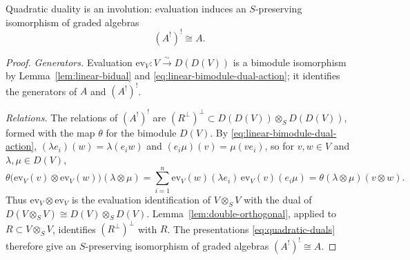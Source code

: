 \begin{theorem}\label{thm:quadratic-involution}
Quadratic duality is an involution: evaluation induces an $S$-preserving isomorphism of graded algebras
\[
(A^!)^!\cong A.
\]
\end{theorem}

\begin{proof}
\emph{Generators.} Evaluation $\mathrm{ev}_V:V\xrightarrow{\sim}D(D(V))$ is a bimodule isomorphism by Lemma~\ref{lem:linear-bidual} and \eqref{eq:linear-bimodule-dual-action}; it identifies the generators of $A$ and $(A^!)^!$.

\emph{Relations.} The relations of $(A^!)^!$ are $(R^\perp)^\perp\subset D(D(V))\otimes_S D(D(V))$, formed with the map $\theta$ for the bimodule $D(V)$.
By \eqref{eq:linear-bimodule-dual-action}, $(\lambda e_i)(w)=\lambda(e_iw)$ and $(e_i\mu)(v)=\mu(ve_i)$, so for $v,w\in V$ and $\lambda,\mu\in D(V)$,
\begin{equation}\label{eq:bidual-tensor-square}
\theta\bigl(\mathrm{ev}_V(v)\otimes\mathrm{ev}_V(w)\bigr)(\lambda\otimes\mu)
=\sum_{i=1}^n\mathrm{ev}_V(w)(\lambda e_i)\,\mathrm{ev}_V(v)(e_i\mu)
=\theta(\lambda\otimes\mu)(v\otimes w).
\end{equation}
Thus $\mathrm{ev}_V\otimes\mathrm{ev}_V$ is the evaluation identification of $V\otimes_S V$ with the dual of $D(V\otimes_S V)\cong D(V)\otimes_S D(V)$.
Lemma~\ref{lem:double-orthogonal}, applied to $R\subset V\otimes_S V$, identifies $(R^\perp)^\perp$ with $R$.
The presentations \eqref{eq:quadratic-duals} therefore give an $S$-preserving isomorphism of graded algebras $(A^!)^!\cong A$.
\end{proof}

